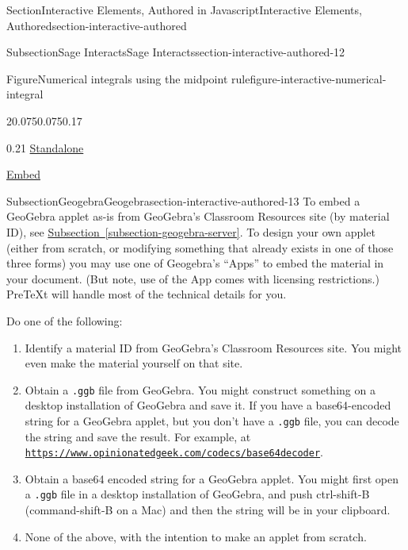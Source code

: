 \documentclass[twoside,10pt,]{article}
\newcommand{\xreffont}{\relax}
\newcommand{\mono}[1]{\texttt{#1}}
\numberwithin{equation}{section}
\begin{document}
\begin{sectionptx}{Section}{Interactive Elements, Authored in Javascript}{}{Interactive Elements, Authored}{}{}{section-interactive-authored}
\begin{subsectionptx}{Subsection}{Sage Interacts}{}{Sage Interacts}{}{}{section-interactive-authored-12}
\begin{figureptx}{Figure}{Numerical integrals using the midpoint rule}{figure-interactive-numerical-integral}{}
\begin{sidebyside}{2}{0.075}{0.075}{0.17}
\begin{sbspanel}{0.21}
\href{https://pretextbook.org/examples/sample-article/html/interactive-numerical-integral.html}{Standalone}%
\par
\href{https://pretextbook.org/examples/sample-article/html/interactive-numerical-integral-if.html}{Embed}%
\end{sbspanel}%
\end{sidebyside}%
\tcblower
\end{figureptx}%
\end{subsectionptx}
%
%
\typeout{************************************************}
\typeout{************************************************}
%
\begin{subsectionptx}{Subsection}{Geogebra}{}{Geogebra}{}{}{section-interactive-authored-13}
To embed a GeoGebra applet as-is from GeoGebra's Classroom Resources site (by material ID), see \hyperref[subsection-geogebra-server]{Subsection~{\xreffont\ref{subsection-geogebra-server}}}. To design your own applet (either from scratch, or modifying something that already exists in one of those three forms) you may use one of Geogebra's ``Apps'' to embed the material in your document. (But note, use of the App comes with licensing restrictions.) PreTeXt will handle most of the technical details for you.%
\par
Do one of the following:%
\begin{enumerate}
\item{}Identify a material ID from GeoGebra's Classroom Resources site. You might even make the material yourself on that site.%
\item{}Obtain a \mono{.ggb} file from GeoGebra. You might construct something on a desktop installation of GeoGebra and save it. If you have a base64-encoded string for a GeoGebra applet, but you don't have a \mono{.ggb} file, you can decode the string and save the result. For example, at \href{https://www.opinionatedgeek.com/codecs/base64decoder}{\nolinkurl{https://www.opinionatedgeek.com/codecs/base64decoder}}.%
\item{}Obtain a base64 encoded string for a GeoGebra applet. You might first open a \mono{.ggb} file in a desktop installation of GeoGebra, and push ctrl-shift-B (command-shift-B on a Mac) and then the string will be in your clipboard.%
\item{}None of the above, with the intention to make an applet from scratch.%
\end{enumerate}
%
\par

\end{subsectionptx}
\end{sectionptx}
\end{document}
